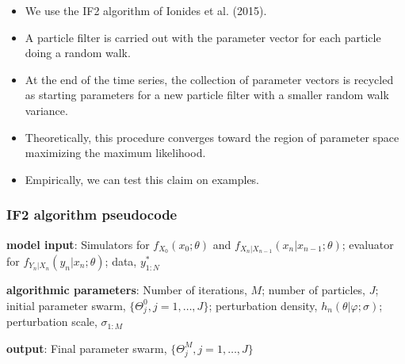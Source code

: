 \documentclass[]{article}
\begin{document}
\begin{itemize}
\item
  We use the IF2 algorithm of Ionides et al. (2015).
\item
  A particle filter is carried out with the parameter vector for each
  particle doing a random walk.
\item
  At the end of the time series, the collection of parameter vectors is
  recycled as starting parameters for a new particle filter with a
  smaller random walk variance.
\item
  Theoretically, this procedure converges toward the region of parameter
  space maximizing the maximum likelihood.
\item
  Empirically, we can test this claim on examples.
\end{itemize}

\subsubsection{IF2 algorithm pseudocode}\label{if2-algorithm-pseudocode}

\textbf{model input}: Simulators for \(f_{X_0}(x_0;\theta)\) and
\(f_{X_n|X_{n-1}}(x_n| x_{n-1}; \theta)\); evaluator for
\(f_{Y_n|X_n}(y_n| x_n;\theta)\); data, \(y^*_{1:N}\)

\textbf{algorithmic parameters}: Number of iterations, \(M\); number of
particles, \(J\); initial parameter swarm,
\(\{\Theta^0_j, j=1,\dots,J\}\); perturbation density,
\(h_n(\theta|\varphi;\sigma)\); perturbation scale, \(\sigma_{1{:}M}\)

\textbf{output}: Final parameter swarm, \(\{\Theta^M_j, j=1,\dots,J\}\)
\end{document}
